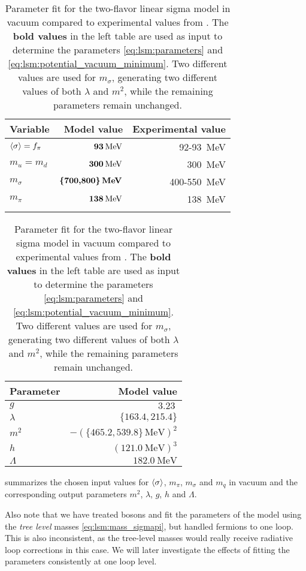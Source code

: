 \begin{table}[t]
\centering
\begin{tabular}{ l r r }
	\toprule
	Variable & Model value                             & Experimental value \\
	\midrule
	$\langle \sigma \rangle=f_\pi$ & $\textbf{\SI{93}{\mega\electronvolt}}$  & \SI{92}{}-\SI{93}{\mega\electronvolt} \\
	$m_u=m_d$            & $\textbf{\SI{300}{\mega\electronvolt}}$ & \approx \, \SI{300}{\mega\electronvolt} \\
	$m_\sigma$           & $\textbf{\{700,800\}\,\si{\mega\electronvolt}}$ & \SI{400}{}-\SI{550}{\mega\electronvolt}          \\
	$m_\pi$              & $\textbf{\SI{138}{\mega\electronvolt}}$ & \SI{138}{\mega\electronvolt}                     \\
	\\
	\bottomrule
\end{tabular}
\hfill
\begin{tabular}{ l r }
	\toprule
	Parameter   & Model value                           \\
	\midrule
	$g$         & $\SI{3.23}{}$                         \\
	$\lambda$   & $\{163.4,215.4\}$                        \\
	$m^2$       & $-(\{465.2,539.8\} \, \si{\mega\electronvolt})^2$ \\
	$h$         & $(\SI{121.0}{\mega\electronvolt})^3$  \\
	$\Lambda$   & $\SI{182.0}{\mega\electronvolt}$ \\
	\bottomrule
\end{tabular}
\caption{\label{tab:lsm2f:parameters}%
Parameter fit for the two-flavor linear sigma model in vacuum compared to experimental values from \cite{ref:pdg_review_2021}.
The \textbf{bold values} in the left table are used as input to determine the parameters \eqref{eq:lsm:parameters} and \eqref{eq:lsm:potential_vacuum_minimum}.
Two different values are used for $m_\sigma$, generating two different values of both $\lambda$ and $m^2$, while the remaining parameters remain unchanged.
}
\end{table}

 summarizes the chosen input values for $\langle \sigma \rangle$, $m_\pi$, $m_\sigma$ and $m_q$ in vacuum and the corresponding output parameters $m^2$, $\lambda$, $g$, $h$ and $\Lambda$.

Also note that we have treated bosons and fit the parameters of the model using the \emph{tree level} masses \eqref{eq:lsm:mass_sigmapi},
but handled fermions to one loop. 
This is also inconsistent, as the tree-level masses would really receive radiative loop corrections in this case.
We will later investigate the effects of fitting the parameters consistently at one loop level.

